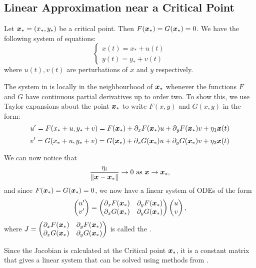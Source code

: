 \subsection{Linear Approximation near a Critical Point}\label{sec:linearapproxcp}

Let $\bm{x}_{\ast} = (x_{\ast},y_{\ast})$ be a critical point. Then $F(\bm{x}_{\ast}) = G(\bm{x}_{\ast}) = 0$. We have the following system of equations:
\[
\begin{cases}
	x(t) = x_{\ast} + u(t) \\
	y(t) = y_{\ast} + v(t)
\end{cases}
\]
where $u(t), v(t)$ are perturbations of $x$ and $y$ respectively.

The system in  is locally in the neighbourhood of $\bm{x}_{\ast}$ whenever the functions $F$ and $G$ have continuous partial derivatives up to order two. To show this, we use Taylor expansions about the point $\bm{x}_{\ast}$ to write $F(x, y)$ and $G(x, y)$ in the form:
\[ 
u' = F(x_{\ast} + u, y_{\ast} + v) = F(\bm{x}_{\ast}) + \partial_x F(\bm{x}_{\ast})u + \partial_y F(\bm{x}_{\ast})v + \eta_1 \bm{x}(t) \]
\[
v' = G(x_{\ast} + u, y_{\ast} + v) = G(\bm{x}_{\ast}) + \partial_x G(\bm{x}_{\ast})u + \partial_y G(\bm{x}_{\ast})v + \eta_2 \bm{x}(t)
\]

We can now notice that
\[
\frac{\eta_i}{\Vert \bm{x} - \bm{x}_{\ast} \Vert} \rightarrow 0 \text{ as } \bm{x} \rightarrow \bm{x}_{\ast},
\]
and since $F(\bm{x}_{\ast}) = G(\bm{x}_{\ast})=0$, we now have a linear system of ODEs of the form
\begin{equation}\label{3.2}
	\begin{pmatrix}u'\\v'\end{pmatrix} = \begin{pmatrix}\partial_x F(\bm{x}_{\ast}) & \partial_y F(\bm{x}_{\ast}) \\ \partial_x G(\bm{x}_{\ast}) & \partial_y G(\bm{x}_{\ast})\end{pmatrix} \begin{pmatrix}u\\v\end{pmatrix},
\end{equation}
where $J = \begin{pmatrix}\partial_x F(\bm{x}_{\ast}) & \partial_y F(\bm{x}_{\ast}) \\ \partial_x G(\bm{x}_{\ast}) & \partial_y G(\bm{x}_{\ast})\end{pmatrix}$ is called the .

Since the Jacobian is calculated at the Critical point $\bm{x}_{\ast}$, it is a constant matrix that gives a linear system that can be solved using methods from .

